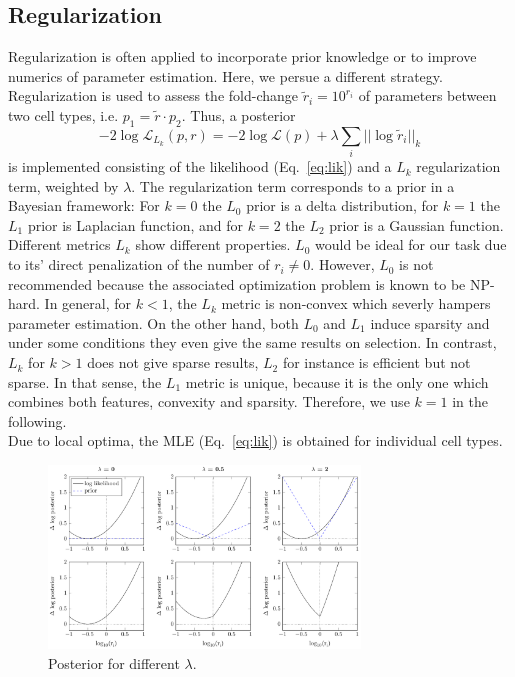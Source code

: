 \documentclass{bioinfo}
\begin{document}
\subsection{Regularization}
Regularization is often applied to incorporate prior knowledge or to improve numerics of parameter estimation.
Here, we persue a different strategy.
Regularization is used to assess the fold-change $\tilde r_i = 10^{r_i}$ of parameters between two cell types, i.e. $p_1 = \tilde r \cdot p_2$.
Thus, a posterior
\begin{equation}
-2\log \mathcal L_{L_k}(p,r) = -2\log \mathcal L(p) + \lambda \sum_i ||\log \tilde r_i||_k\label{eq:likreg}%
\end{equation}
is implemented consisting of the likelihood (Eq.~\ref{eq:lik}) and a $L_k$ regularization term, weighted by $\lambda$.
The regularization term corresponds to a prior in a Bayesian framework:
For $k=0$ the $L_0$ prior is a delta distribution, for $k=1$ the $L_1$ prior is Laplacian function, and for $k=2$ the $L_2$ prior is a Gaussian function.\\
Different metrics $L_k$ show different properties.
$L_0$ would be ideal for our task due to its' direct penalization of the number of $r_i \neq 0$.
However, $L_0$ is not recommended because the associated optimization problem is known to be NP-hard.
In general, for $k<1$, the $L_k$ metric is non-convex which severly hampers parameter estimation.
On the other hand, both $L_0$ and $L_1$ induce sparsity and under some conditions they even give the same results on selection.
In contrast, $L_k$ for $k>1$ does not give sparse results, $L_2$ for instance is efficient but not sparse.
In that sense, the $L_1$ metric is unique, because it is the only one which combines both features, convexity and sparsity.
Therefore, we use $k=1$ in the following.\\
Due to local optima, the MLE (Eq.~\ref{eq:lik}) is obtained for individual cell types.

\begin{figure}[!tpb]%
\centerline{\includegraphics[width=235pt]{Figures/l1_cartoon_priorstrength.pdf}}
\caption{Posterior for different $\lambda$.}\label{fig:01}
\end{figure}
\end{document}
